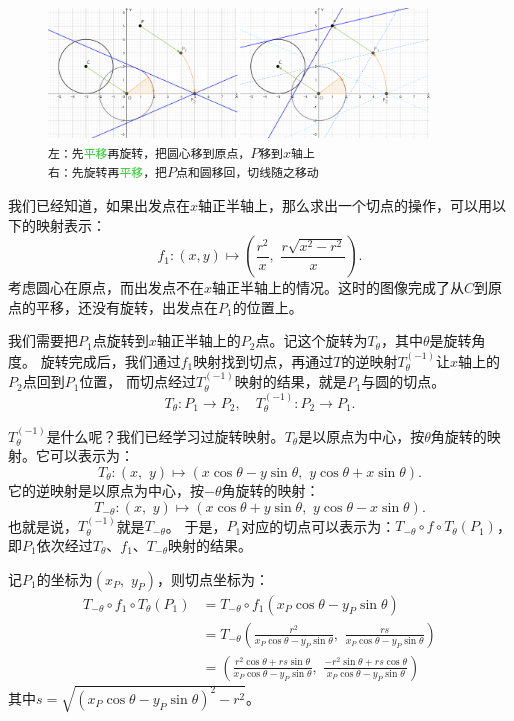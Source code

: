\documentclass[12pt,UTF8]{ctexbook}
\begin{document}
\begin{figure}[h]
    \vspace{4pt}
    \centering
    \includegraphics[width=0.9\textwidth]{tu/求切线变换1.png}
    \captionsetup{justification=centering}
    \caption*{\texttt{左：先\textcolor{LimeGreen}{平移}再\textcolor{YellowOrange}{旋转}，把圆心移到原点，$P$移到$x$轴上\\ 
                      右：先\textcolor{YellowOrange}{旋转}再\textcolor{LimeGreen}{平移}，把$P$点和圆移回，切线随之移动}}
\end{figure}

我们已经知道，如果出发点在$x$轴正半轴上，那么求出一个切点的操作，可以用以下的映射表示：
$$f_1: (x, y) \mapsto \left(\frac{r^2}{x},\,\, \frac{r\sqrt{x^2 - r^2}}{x}\right).$$
考虑圆心在原点，而出发点不在$x$轴正半轴上的情况。这时的图像完成了从$C$到原点的平移，还没有旋转，出发点在$P_1$的位置上。

我们需要把$P_1$点旋转到$x$轴正半轴上的$P_2$点。记这个旋转为$T_\theta$，其中$\theta$是旋转角度。
旋转完成后，我们通过$f_1$映射找到切点，再通过$T$的逆映射$T_\theta^{(-1)}$让$x$轴上的$P_2$点回到$P_1$位置，
而切点经过$T_\theta^{(-1)}$映射的结果，就是$P_1$与圆的切点。
$$T_\theta: P_1 \longrightarrow P_2, \quad T_\theta^{(-1)}: P_2 \longrightarrow P_1.$$

$T_\theta^{(-1)}$是什么呢？我们已经学习过旋转映射。$T_\theta$是以原点为中心，按$\theta$角旋转的映射。它可以表示为：
$$T_\theta: (x,\,\, y) \mapsto (x\cos{\theta} - y\sin{\theta},\,\,y\cos{\theta} + x\sin{\theta}).$$
它的逆映射是以原点为中心，按$-\theta$角旋转的映射：
$$T_{-\theta}: (x,\,\, y) \mapsto (x\cos{\theta} + y\sin{\theta},\,\,y\cos{\theta} - x\sin{\theta}).$$
也就是说，$T_\theta^{(-1)}$就是$T_{-\theta}$。
于是，$P_1$对应的切点可以表示为：$T_{-\theta}\circ f\circ T_\theta(P_1)$，即$P_1$依次经过$T_\theta$、$f_1$、$T_{-\theta}$映射的结果。

记$P_1$的坐标为$(x_P,\,\,y_P)$，则切点坐标为：
\begin{align*}
    T_{-\theta}\circ f_1\circ T_\theta(P_1) &= T_{-\theta}\circ f_1(x_P\cos{\theta} - y_P\sin{\theta})  \\
    &= T_{-\theta}\left(\frac{r^2}{x_P\cos{\theta} - y_P\sin{\theta}},\,\, \frac{rs}{x_P\cos{\theta} - y_P\sin{\theta}}\right)  \\
    &= \left(\frac{r^2\cos{\theta} + rs\sin{\theta}}{x_P\cos{\theta} - y_P\sin{\theta}},\,\, \frac{-r^2\sin{\theta} + rs\cos{\theta}}{x_P\cos{\theta} - y_P\sin{\theta}}\right) 
\end{align*}
其中$s = \sqrt{(x_P\cos{\theta} - y_P\sin{\theta})^2 - r^2}$。
\end{document}
